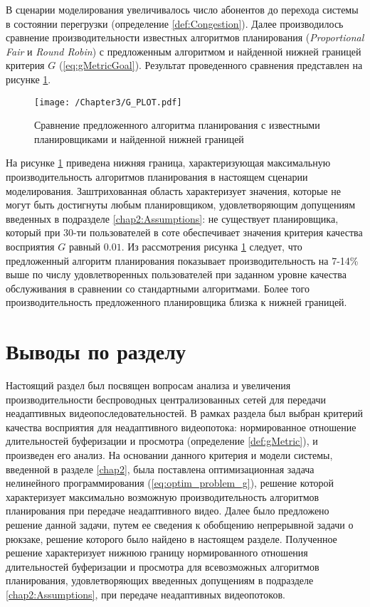 В сценарии моделирования увеличивалось число абонентов до перехода системы в состоянии перегрузки (определение \ref{def:Congestion}). Далее производилось сравнение производительности известных алгоритмов планирования (\textit{Proportional Fair} и \textit{Round Robin}) с предложенным алгоритмом и найденной нижней границей критерия $G$ (\ref{eq:gMetricGoal}). Результат проведенного сравнения представлен на рисунке \ref{fig:G_PLOT}.

\begin{figure}[htbp]
\begin{center}
\texttt{[image: /Chapter3/G\_PLOT.pdf]}
\caption{Сравнение предложенного алгоритма планирования с известными планировщиками и найденной нижней границей}
\label{fig:G_PLOT}
\end{center}
\end{figure}

На рисунке \ref{fig:G_PLOT} приведена нижняя граница, характеризующая максимальную производительность алгоритмов планирования в настоящем сценарии моделирования. Заштрихованная область характеризует значения, которые не могут быть достигнуты любым планировщиком, удовлетворяющим допущениям введенных в подразделе \ref{chap2:Assumptions}: не существует планировщика, который при 30-ти пользователей в соте обеспечивает значения критерия качества восприятия $G$ равный $0.01$. Из рассмотрения рисунка \ref{fig:G_PLOT} следует, что предложенный алгоритм планирования показывает производительность на 7-14\% выше по числу удовлетворенных пользователей при заданном уровне качества обслуживания в сравнении со стандартными алгоритмами. Более того производительность предложенного планировщика близка к нижней границей.

\section{Выводы по разделу}

Настоящий раздел был посвящен вопросам анализа и увеличения производительности беспроводных централизованных сетей для передачи неадаптивных видеопоследовательностей. В рамках раздела был выбран критерий качества восприятия для неадаптивного видеопотока: нормированное отношение длительностей буферизации и просмотра (определение \ref{def:gMetric}), и произведен его анализ. На основании данного критерия и модели системы, введенной в разделе \ref{chap2}, была поставлена оптимизационная задача нелинейного программирования (\ref{eq:optim_problem_g}), решение которой характеризует максимально возможную производительность алгоритмов планирования при передаче неадаптивного видео. Далее было предложено решение данной задачи, путем ее сведения к обобщению непрерывной задачи о рюкзаке, решение которого было найдено в настоящем разделе. Полученное решение характеризует нижнюю границу нормированного отношения длительностей буферизации и просмотра для всевозможных алгоритмов планирования, удовлетворяющих введенных допущениям в подразделе \ref{chap2:Assumptions}, при передаче неадаптивных видеопотоков.

